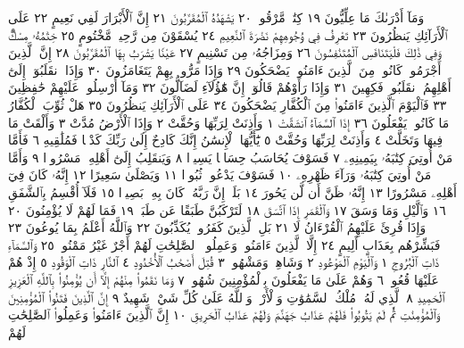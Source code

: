 وَمَآ أَدْرَىٰكَ مَا عِلِّيُّونَ ١٩ كِتَٰبࣱ مَّرْقُومࣱ ٢٠ يَشْهَدُهُ ٱلْمُقَرَّبُونَ ٢١
إِنَّ ٱلْأَبْرَارَ لَفِي نَعِيمٍ ٢٢ عَلَى ٱلْأَرَآئِكِ يَنظُرُونَ ٢٣ تَعْرِفُ فِي
وُجُوهِهِمْ نَضْرَةَ ٱلنَّعِيمِ ٢٤ يُسْقَوْنَ مِن رَّحِيقࣲ مَّخْتُومٍ ٢٥ خِتَٰمُهُۥ
مِسْكࣱۚ وَفِي ذَٰلِكَ فَلْيَتَنَافَسِ ٱلْمُتَنَٰفِسُونَ ٢٦ وَمِزَاجُهُۥ مِن
تَسْنِيمٍ ٢٧ عَيْنࣰا يَشْرَبُ بِهَا ٱلْمُقَرَّبُونَ ٢٨ إِنَّ ٱلَّذِينَ أَجْرَمُوا۟ كَانُوا۟
مِنَ ٱلَّذِينَ ءَامَنُوا۟ يَضْحَكُونَ ٢٩ وَإِذَا مَرُّوا۟ بِهِمْ يَتَغَامَزُونَ ٣٠
وَإِذَا ٱنقَلَبُوٓا۟ إِلَىٰٓ أَهْلِهِمُ ٱنقَلَبُوا۟ فَكِهِينَ ٣١ وَإِذَا رَأَوْهُمْ قَالُوٓا۟
إِنَّ هَٰٓؤُلَآءِ لَضَآلُّونَ ٣٢ وَمَآ أُرْسِلُوا۟ عَلَيْهِمْ حَٰفِظِينَ ٣٣
فَٱلْيَوْمَ ٱلَّذِينَ ءَامَنُوا۟ مِنَ ٱلْكُفَّارِ يَضْحَكُونَ ٣٤ عَلَى
ٱلْأَرَآئِكِ يَنظُرُونَ ٣٥ هَلْ ثُوِّبَ ٱلْكُفَّارُ مَا كَانُوا۟ يَفْعَلُونَ ٣٦
إِذَا ٱلسَّمَآءُ ٱنشَقَّتْ ١ وَأَذِنَتْ لِرَبِّهَا وَحُقَّتْ ٢ وَإِذَا ٱلْأَرْضُ مُدَّتْ ٣
وَأَلْقَتْ مَا فِيهَا وَتَخَلَّتْ ٤ وَأَذِنَتْ لِرَبِّهَا وَحُقَّتْ ٥ يَٰٓأَيُّهَا
ٱلْإِنسَٰنُ إِنَّكَ كَادِحٌ إِلَىٰ رَبِّكَ كَدْحࣰا فَمُلَٰقِيهِ ٦ فَأَمَّا مَنْ أُوتِيَ
كِتَٰبَهُۥ بِيَمِينِهِۦ ٧ فَسَوْفَ يُحَاسَبُ حِسَابࣰا يَسِيرࣰا ٨ وَيَنقَلِبُ
إِلَىٰٓ أَهْلِهِۦ مَسْرُورࣰا ٩ وَأَمَّا مَنْ أُوتِيَ كِتَٰبَهُۥ وَرَآءَ ظَهْرِهِۦ ١٠ فَسَوْفَ
يَدْعُوا۟ ثُبُورࣰا ١١ وَيَصْلَىٰ سَعِيرًا ١٢ إِنَّهُۥ كَانَ فِيٓ أَهْلِهِۦ مَسْرُورًا ١٣
إِنَّهُۥ ظَنَّ أَن لَّن يَحُورَ ١٤ بَلَىٰٓۚ إِنَّ رَبَّهُۥ كَانَ بِهِۦ بَصِيرࣰا ١٥ فَلَآ أُقْسِمُ
بِٱلشَّفَقِ ١٦ وَٱلَّيْلِ وَمَا وَسَقَ ١٧ وَٱلْقَمَرِ إِذَا ٱتَّسَقَ ١٨
لَتَرْكَبُنَّ طَبَقًا عَن طَبَقࣲ ١٩ فَمَا لَهُمْ لَا يُؤْمِنُونَ ٢٠ وَإِذَا قُرِئَ
عَلَيْهِمُ ٱلْقُرْءَانُ لَا  ٢١ بَلِ ٱلَّذِينَ كَفَرُوا۟ يُكَذِّبُونَ ٢٢
وَٱللَّهُ أَعْلَمُ بِمَا يُوعُونَ ٢٣ فَبَشِّرْهُم بِعَذَابٍ أَلِيمٍ ٢٤
إِلَّا ٱلَّذِينَ ءَامَنُوا۟ وَعَمِلُوا۟ ٱلصَّٰلِحَٰتِ لَهُمْ أَجْرٌ غَيْرُ مَمْنُونِۭ ٢٥
وَٱلسَّمَآءِ ذَاتِ ٱلْبُرُوجِ ١ وَٱلْيَوْمِ ٱلْمَوْعُودِ ٢ وَشَاهِدࣲ وَمَشْهُودࣲ ٣
قُتِلَ أَصْحَٰبُ ٱلْأُخْدُودِ ٤ ٱلنَّارِ ذَاتِ ٱلْوَقُودِ ٥ إِذْ هُمْ عَلَيْهَا
قُعُودࣱ ٦ وَهُمْ عَلَىٰ مَا يَفْعَلُونَ بِٱلْمُؤْمِنِينَ شُهُودࣱ ٧ وَمَا نَقَمُوا۟
مِنْهُمْ إِلَّآ أَن يُؤْمِنُوا۟ بِٱللَّهِ ٱلْعَزِيزِ ٱلْحَمِيدِ ٨ ٱلَّذِي لَهُۥ مُلْكُ
ٱلسَّمَٰوَٰتِ وَٱلْأَرْضِۚ وَٱللَّهُ عَلَىٰ كُلِّ شَيْءࣲ شَهِيدٌ ٩ إِنَّ ٱلَّذِينَ
فَتَنُوا۟ ٱلْمُؤْمِنِينَ وَٱلْمُؤْمِنَٰتِ ثُمَّ لَمْ يَتُوبُوا۟ فَلَهُمْ عَذَابُ جَهَنَّمَ وَلَهُمْ
عَذَابُ ٱلْحَرِيقِ ١٠ إِنَّ ٱلَّذِينَ ءَامَنُوا۟ وَعَمِلُوا۟ ٱلصَّٰلِحَٰتِ لَهُمْ
